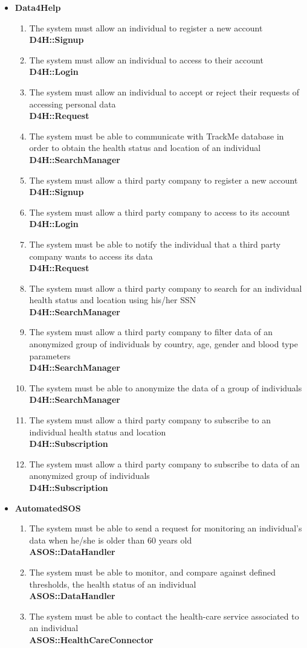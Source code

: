 \documentclass[a4paper, hidelinks, 12pt]{report}
\newcommand\requirement[1]{\item[{[R#1]}] }
\begin{document}
\begin{itemize}
	\item{\textbf{Data4Help}}
	\begin{enumerate}
		\requirement{1} The system must allow an individual to register a new account \\
		\textbf{D4H::Signup}
		\requirement{2} The system must allow an individual to access to their account \\
		\textbf{D4H::Login}
		\requirement{3} The system must allow an individual to accept or reject their requests of accessing personal data \\
		\textbf{D4H::Request}
		\requirement{4} The system must be able to communicate with TrackMe database in order to obtain the health status and location of an individual \\
		\textbf{D4H::SearchManager}
		\requirement{5} The system must allow a third party company to register a new account \\								\textbf{D4H::Signup}
		\requirement{6} The system must allow a third party company to access to its account 	\\								\textbf{D4H::Login}
		\requirement{7} The system must be able to notify the individual that a third party company wants to access its data \\
		\textbf{D4H::Request}
		\requirement{8} The system must allow a third party company to search for an individual health status and location using his/her SSN \\
		 \textbf{D4H::SearchManager}
		 \requirement{9} The system must allow a third party company to filter data of an anonymized group of individuals by country, age, gender and blood type parameters \\ 
		 \textbf{D4H::SearchManager}
		 \requirement{10} The system must be able to anonymize the data of a group of individuals \\
		 \textbf{D4H::SearchManager}
		 \requirement{11} The system must allow a third party company to subscribe to an individual health status and location \\ 
		\textbf{D4H::Subscription}
		\requirement{12} The system must allow a third party company to subscribe to data of an anonymized group of individuals \\
		\textbf{D4H::Subscription}
	\end{enumerate}	
		
	\item{\textbf{AutomatedSOS}}
	\begin{enumerate}
		\requirement{13} The system must be able to send a request for monitoring an individual's data when he/she is older than 60 years old \\
		\textbf{ASOS::DataHandler}
		\requirement{14} The system must be able to monitor, and compare against defined thresholds, the health status of an individual \\
		\textbf{ASOS::DataHandler}
		\requirement{15} The system must be able to contact the health-care service associated to an individual \\
		\textbf{ASOS::HealthCareConnector}
	\end{enumerate}
	

\end{itemize}
\end{document}
